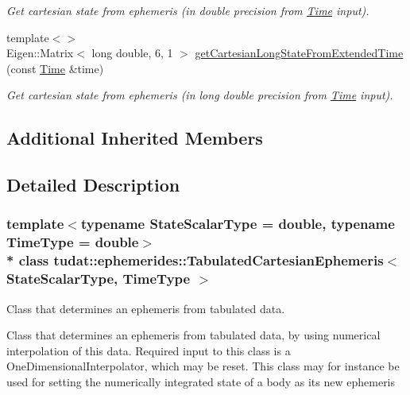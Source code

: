 \begin{DoxyCompactItemize}
\begin{DoxyCompactList}\small\item\em Get cartesian state from ephemeris (in double precision from \hyperlink{classtudat_1_1Time}{Time} input). \end{DoxyCompactList}\item 
{\footnotesize template$<$$>$ }\\Eigen\+::\+Matrix$<$ long double, 6, 1 $>$ \hyperlink{classtudat_1_1ephemerides_1_1TabulatedCartesianEphemeris_a4c744c1424da9db9b01e4339d5e2d378}{get\+Cartesian\+Long\+State\+From\+Extended\+Time} (const \hyperlink{classtudat_1_1Time}{Time} \&time)\hypertarget{classtudat_1_1ephemerides_1_1TabulatedCartesianEphemeris_a4c744c1424da9db9b01e4339d5e2d378}{}\label{classtudat_1_1ephemerides_1_1TabulatedCartesianEphemeris_a4c744c1424da9db9b01e4339d5e2d378}

\begin{DoxyCompactList}\small\item\em Get cartesian state from ephemeris (in long double precision from \hyperlink{classtudat_1_1Time}{Time} input). \end{DoxyCompactList}\end{DoxyCompactItemize}
\subsection*{Additional Inherited Members}


\subsection{Detailed Description}
\subsubsection*{template$<$typename State\+Scalar\+Type = double, typename Time\+Type = double$>$\\*
class tudat\+::ephemerides\+::\+Tabulated\+Cartesian\+Ephemeris$<$ State\+Scalar\+Type, Time\+Type $>$}

Class that determines an ephemeris from tabulated data. 

Class that determines an ephemeris from tabulated data, by using numerical interpolation of this data. Required input to this class is a One\+Dimensional\+Interpolator, which may be reset. This class may for instance be used for setting the numerically integrated state of a body as its \textquotesingle{}new\textquotesingle{} ephemeris 

